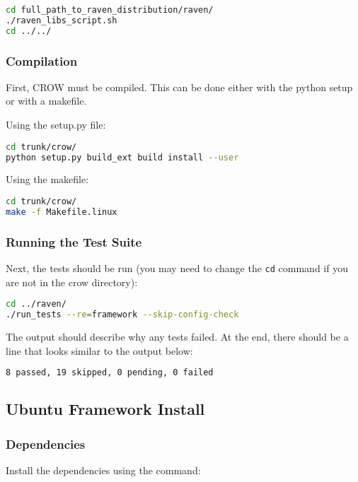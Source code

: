 \begin{lstlisting}[language=bash]
cd full_path_to_raven_distribution/raven/
./raven_libs_script.sh
cd ../../
\end{lstlisting}

\subsubsection{Compilation}

First, CROW must be compiled. This can be done either with the python setup or
with a makefile.

Using the setup.py file:
\begin{lstlisting}[language=bash]
cd trunk/crow/
python setup.py build_ext build install --user
\end{lstlisting}

Using the makefile:
\begin{lstlisting}[language=bash]
cd trunk/crow/
make -f Makefile.linux
\end{lstlisting}

\subsubsection{Running the Test Suite}

Next, the tests should be run (you may need to change the \texttt{cd}
command if you are not in the crow directory):

\begin{lstlisting}[language=bash]
cd ../raven/
./run_tests --re=framework --skip-config-check
\end{lstlisting}

The output should describe why any tests failed.
%
At the end, there should be a line that looks similar to the output below:
\begin{lstlisting}[language=bash]
8 passed, 19 skipped, 0 pending, 0 failed
\end{lstlisting}

\subsection{Ubuntu Framework Install}

\subsubsection{Dependencies}
Install the dependencies using the command:

